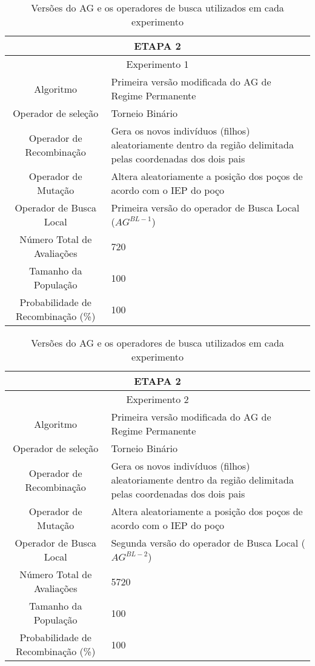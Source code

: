  \begin{table}[H]
\centering
\caption{Versões do AG e os operadores de busca utilizados em cada experimento}

\begin{tabular}{|c|p{10cm}|}
 \hline
 \multicolumn{2}{|c|}{ETAPA 2} \\ \hline
 \multicolumn{2}{|c|}{Experimento 1} \\ \hline
 {Algoritmo} & Primeira versão modificada do AG de Regime Permanente  \\ \hline
 Operador de seleção & Torneio Binário \\ \hline
 Operador de Recombinação & Gera os novos indivíduos (filhos) aleatoriamente dentro da região delimitada pelas coordenadas dos dois pais \\  \hline
 Operador de Mutação & Altera aleatoriamente a posição dos poços de acordo com o IEP do poço \\ \hline
 Operador de Busca Local & Primeira versão do operador de Busca Local ($AG^{BL-1}$) \\ \hline
 Número Total de Avaliações & 720 \\ \hline
 Tamanho da População & 100 \\ \hline
 Probabilidade de Recombinação (\%) & 100 \\ \hline
 
 
\end{tabular}
\end{table} 
 
 \begin{table}[H]
\centering
\caption{Versões do AG e os operadores de busca utilizados em cada experimento}

\begin{tabular}{|c|p{10cm}|}
 \hline
 \multicolumn{2}{|c|}{ETAPA 2} \\ \hline
 \multicolumn{2}{|c|}{Experimento 2} \\ \hline
 {Algoritmo} & Primeira versão modificada do AG de Regime Permanente \\ \hline
 Operador de seleção & Torneio Binário \\ \hline
 Operador de Recombinação & Gera os novos indivíduos (filhos) aleatoriamente dentro da região delimitada pelas coordenadas dos dois pais \\  \hline
 Operador de Mutação & Altera aleatoriamente a posição dos poços de acordo com o IEP do poço \\ \hline
 Operador de Busca Local & Segunda versão do operador de Busca Local ($AG^{BL-2}$) \\ \hline
 Número Total de Avaliações & 5720 \\ \hline
 Tamanho da População & 100 \\ \hline
 Probabilidade de Recombinação (\%) & 100 \\ \hline
 
 
 
\end{tabular}
\end{table}


